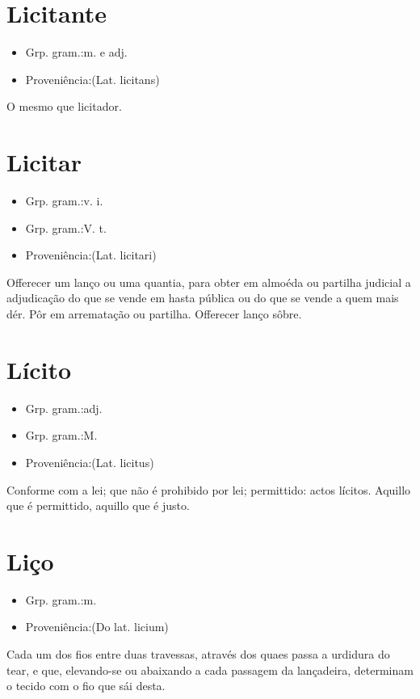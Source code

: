 \section{Licitante}
\begin{itemize}
\item {Grp. gram.:m.  e  adj.}
\end{itemize}
\begin{itemize}
\item {Proveniência:(Lat. \textunderscore licitans\textunderscore )}
\end{itemize}
O mesmo que \textunderscore licitador\textunderscore .
\section{Licitar}
\begin{itemize}
\item {Grp. gram.:v. i.}
\end{itemize}
\begin{itemize}
\item {Grp. gram.:V. t.}
\end{itemize}
\begin{itemize}
\item {Proveniência:(Lat. \textunderscore licitari\textunderscore )}
\end{itemize}
Offerecer um lanço ou uma quantia, para obter em almoéda ou partilha judicial a adjudicação do que se vende em hasta pública ou do que se vende a quem mais dér.
Pôr em arrematação ou partilha.
Offerecer lanço sôbre.
\section{Lícito}
\begin{itemize}
\item {Grp. gram.:adj.}
\end{itemize}
\begin{itemize}
\item {Grp. gram.:M.}
\end{itemize}
\begin{itemize}
\item {Proveniência:(Lat. \textunderscore licitus\textunderscore )}
\end{itemize}
Conforme com a lei; que não é prohibido por lei; permittido: \textunderscore actos lícitos\textunderscore .
Aquillo que é permittido, aquillo que é justo.
\section{Liço}
\begin{itemize}
\item {Grp. gram.:m.}
\end{itemize}
\begin{itemize}
\item {Proveniência:(Do lat. \textunderscore licium\textunderscore )}
\end{itemize}
Cada um dos fios entre duas travessas, através dos quaes passa a urdidura do tear, e que, elevando-se ou abaixando a cada passagem da lançadeira, determinam o tecido com o fio que sái desta.
